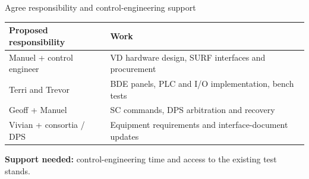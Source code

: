 \documentclass[aspectratio=169,11pt]{beamer}
\begin{document}
\appendix
\DpsBackupsTransition

\begin{frame}{Agree responsibility and control-engineering support}
\renewcommand{\arraystretch}{1.45}
\begin{tabularx}{\textwidth}{@{}>{\RaggedRight\arraybackslash}p{4.1cm}>{\RaggedRight\arraybackslash}X@{}}
\toprule
\textbf{Proposed responsibility} & \textbf{Work}\\\midrule
Manuel + control engineer & VD hardware design, SURF interfaces and procurement\\
Terri and Trevor & BDE panels, PLC and I/O implementation, bench tests\\
Geoff + Manuel & SC commands, DPS arbitration and recovery\\
Vivian + consortia / DPS & Equipment requirements and interface-document updates\\
\bottomrule
\end{tabularx}\par\bigskip
\textbf{Support needed:} control-engineering time and access to the existing test stands.
\end{frame}


\end{document}
